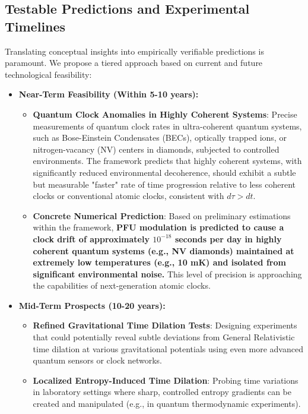 \documentclass[12pt,a4paper]{article}
\numberwithin{equation}{section}
\begin{document}
\subsection{Testable Predictions and Experimental Timelines}
Translating conceptual insights into empirically verifiable predictions is paramount. We propose a tiered approach based on current and future technological feasibility:

\begin{itemize}
    \item \textbf{Near-Term Feasibility (Within 5-10 years):}
    \begin{itemize}
        \item \textbf{Quantum Clock Anomalies in Highly Coherent Systems}: Precise measurements of quantum clock rates in ultra-coherent quantum systems, such as Bose-Einstein Condensates (BECs), optically trapped ions, or nitrogen-vacancy (NV) centers in diamonds, subjected to controlled environments. The framework predicts that highly coherent systems, with significantly reduced environmental decoherence, should exhibit a subtle but measurable "faster" rate of time progression relative to less coherent clocks or conventional atomic clocks, consistent with $d\tau > dt$.
        \item \textbf{Concrete Numerical Prediction}: Based on preliminary estimations within the framework, \textbf{PFU modulation is predicted to cause a clock drift of approximately $10^{-18}$ seconds per day in highly coherent quantum systems (e.g., NV diamonds) maintained at extremely low temperatures (e.g., 10 mK) and isolated from significant environmental noise.} This level of precision is approaching the capabilities of next-generation atomic clocks.
    \end{itemize}
    \item \textbf{Mid-Term Prospects (10-20 years):}
    \begin{itemize}
        \item \textbf{Refined Gravitational Time Dilation Tests}: Designing experiments that could potentially reveal subtle deviations from General Relativistic time dilation at various gravitational potentials using even more advanced quantum sensors or clock networks.
        \item \textbf{Localized Entropy-Induced Time Dilation}: Probing time variations in laboratory settings where sharp, controlled entropy gradients can be created and manipulated (e.g., in quantum thermodynamic experiments).
    \end{itemize}

\end{itemize}
\end{document}

